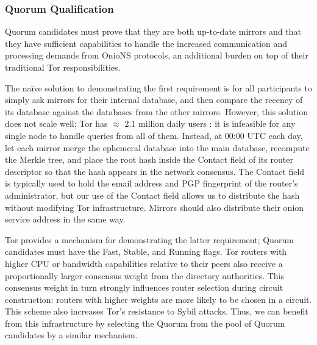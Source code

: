 \documentclass[USenglish,oneside,twocolumn]{article}
\begin{document}


\subsubsection{Quorum Qualification}
\label{sec:qQualification}

Quorum candidates must prove that they are both up-to-date mirrors and that they have sufficient capabilities to handle the increased communication and processing demands from OnioNS protocols, an additional burden on top of their traditional Tor responsibilities.

The na\"{i}ve solution to demonstrating the first requirement is for all participants to simply ask mirrors for their internal database, and then compare the recency of its database against the databases from the other mirrors. However, this solution does not scale well; Tor has $ \approx $ 2.1 million daily users \cite{TorMetrics}: it is infeasible for any single node to handle queries from all of them. Instead, at 00:00 UTC each day, let each mirror merge the ephemeral database into the main database, recompute the Merkle tree, and place the root hash inside the Contact field of its router descriptor so that the hash appears in the network consensus. The Contact field is typically used to hold the email address and PGP fingerprint of the router's administrator, but our use of the Contact field allows us to distribute the hash without modifying Tor infrastructure. Mirrors should also distribute their onion service address in the same way. %

Tor provides a mechanism for demonstrating the latter requirement; Quorum candidates must have the Fast, Stable, and Running flags. Tor routers with higher CPU or bandwidth capabilities relative to their peers also receive a proportionally larger consensus weight from the directory authorities. This consensus weight in turn strongly influences router selection during circuit construction: routers with higher weights are more likely to be chosen in a circuit. This scheme also increases Tor's resistance to Sybil attacks. Thus, we can benefit from this infrastructure by selecting the Quorum from the pool of Quorum candidates by a similar mechanism.
\end{document}
